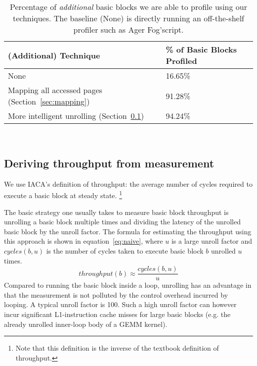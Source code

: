 %
%

\begin{table}
\begin{tabular}{
|p{}|p{}|}
\hline
\textbf{(Additional) Technique} & \textbf{\% of Basic Blocks Profiled} \\
\hline
None & 16.65\% \\

\hline
Mapping all accessed pages (Section~\ref{sec:mapping}) & 91.28\%\\

\hline
More intelligent unrolling (Section~\ref{sec:unrolling}) & 94.24\%\\

\hline
\end{tabular}
\\
\caption{Percentage of \textit{additional} basic blocks we are able to
profile using our techniques.
The baseline (None) is directly running an off-the-shelf profiler such as Ager Fog'script.}
\label{tab:full-ablation}
\end{table}


\subsection{Deriving throughput from measurement}\label{sec:unrolling}
We use IACA's definition of throughput:
the average number of cycles required to execute a basic block 
at steady state.
\footnote{Note that this definition is the inverse of the textbook definition of throughput.}

The basic strategy one usually takes to measure basic block throughput
is unrolling a basic block multiple times and dividing the latency of the
unrolled basic block by the unroll factor.
The formula for estimating the throughput using this approach is shown
in equation~\ref{eq:naive}, where $u$ is a large unroll factor
and $\mathit{cycles}(b,u)$ is the number of cycles taken to execute basic block $b$
unrolled $u$ times.
\begin{equation}
\mathit{throughput}(b) \approx \frac{\mathit{cycles}(b,u)}{u}
\label{eq:naive}
\end{equation}
Compared to running the basic block inside a loop,
unrolling has an advantage in that the measurement is not polluted by
the control overhead incurred by looping.
A typical unroll factor is 100\cite{ithemal,uops}.
Such a high unroll factor can however incur significant
L1-instruction cache misses for large basic blocks
(e.g. the already unrolled inner-loop body of a GEMM kernel).

